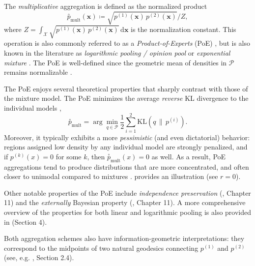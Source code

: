 \documentclass[accepted]{uai2026} %
\newcommand{\vx}{\mathbf{x}}
\newcommand{\compose}[1]{\overset{\circ}{#1}}
\begin{document}
The \emph{multiplicative} aggregation is defined as the normalized product
\begin{equation}
\compose{p}_{\text{mult}}(\vx) \coloneqq \sqrt{p^{(1)}(\vx)\,p^{(2)}(\vx)}/Z,
\end{equation}
where $Z = \int_{\mathcal{X}} \sqrt{p^{(1)}(\vx)\,p^{(2)}(\vx)}\,\mathrm{d}\vx$ is the normalization constant. This operation is also commonly referred to as a \emph{Product-of-Experts} (PoE) \citep{hinton2002training,cohen2021healing, razafindralambo2026two}, 
but is also known in the literature as \emph{logarithmic pooling / opinion pool} \citep{carvalho2023,genest1986characterization,clemen1999combining, elkin2025opinion} or \emph{exponential mixture} \citep{amari2007integration}. The PoE is well-defined since the geometric mean of densities in $\mathcal{P}$ remains normalizable \citep{genest1986characterization,carvalho2023}.

The PoE enjoys several theoretical properties that sharply contrast with those of the mixture model. The PoE minimizes the average \emph{reverse} KL divergence to the individual models \citep{amari2007integration},
\begin{equation}\label{eq: PoE minimizes reverse KL}
\compose{p}_{\text{mult}}
= \arg\min_{q \in \mathcal{P}} \frac{1}{2} \sum_{i=1}^2 \mathrm{KL}\!\left(q \,\|\, p^{(i)}\right).
\end{equation} Moreover, it typically exhibits a more \emph{pessimistic} (and even dictatorial) behavior: regions assigned low density by any individual model are strongly penalized, and if $p^{(k)}(x)=0$ for some $k$, then $\compose{p}_{\text{mult}}(x)=0$ as well. As a result, PoE aggregations tend to produce distributions that are more concentrated, and often closer to unimodal compared to mixtures \citep{winkler1968consensus,genest1986combining}.  provides an illustration (see $r=0$).

Other notable properties of the PoE include \emph{independence preservation} (\citealp{laddaga1977lehrer,cooke1991experts}, Chapter 11) and the \emph{externally} Bayesian property (\citealp{genest1986characterization,cooke1991experts}, Chapter 11). A more comprehensive overview of the properties for both linear and logarithmic pooling is also provided in \cite{elkin2025opinion} (Section 4).

Both aggregation schemes also have information-geometric interpretations: they correspond to the midpoints of two natural geodesics connecting $p^{(1)}$ and $p^{(2)}$ (see, e.g. \citealp{amari2016information}, Section 2.4).
\end{document}
